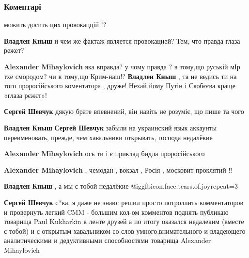  
 
 
 
 
\subsubsection{Коментарі}

\begin{itemize} %
можить досить цих провокаццій !?

\begin{itemize} %
\textbf{Владлен Кныш} и чем же фактаж является провокацией? Тем, что правда глаза режет?

\textbf{Alexander Mihaylovich} яка вправда? у чому правда ? в тому,що руській мІр тхе смородом? чи в тому,що Крим-наш!?
\textbf{Владлен Кныш} , та не ведись ти на того проросійського коментатора , друже!
Нехай йому Путін і Скобєєва краще «глаза рєжєт»!

\textbf{Сергей Шевчук} дякую брате
впевнений, він навіть не розуміє, що пише та чого

\textbf{Владлен Кныш} \textbf{Сергей Шевчук} забыли на украинский язык аккаунты переименовать, прежде, чем хавальники открывать, господа недалёкие

\textbf{Alexander Mihaylovich} ось ти і є приклад бидла проросійського

\textbf{Alexander Mihaylovich} , чемодан , вокзал , Росія , московит проклятий !!

\textbf{Владлен Кныш} , а мы с тобой недалёкие  @igg{fbicon.face.tears.of.joy}{repeat=3} 

\textbf{Сергей Шевчук} с*ка, я даже не знаю: решил просто потроллить комментаторов и провернуть легкий CMM - большим кол-ом комментов поднять публикаю товарища Paul Kukharkin в ленте друзей
а по итогу оказался недалеким (вместе с тобой) и с открытым хавальником со слов умного,внимательного и владеющего аналитическими и дедуктивными способностями товарища Alexander Mihaylovich


\end{itemize}
\end{itemize}
